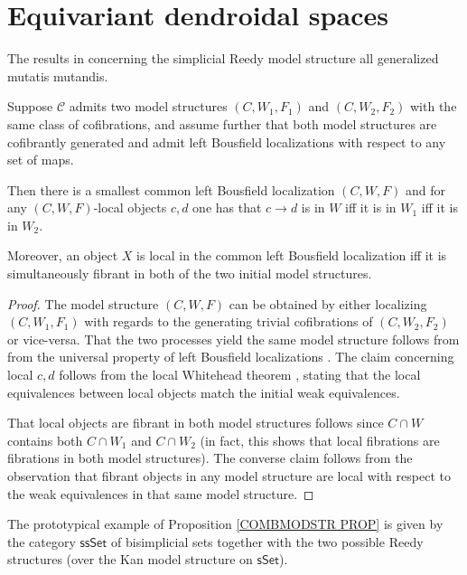 \documentclass[a4paper,10pt,draft]{article}%
\begin{document}
\section{Equivariant dendroidal spaces}

The results in \cite[\S 4]{CM13a}
concerning the simplicial Reedy model structure all generalized mutatis mutandis.

\begin{proposition}\label{COMBMODSTR PROP}
	Suppose $\mathcal{C}$
	admits two model structures $(C,W_1,F_1)$ and $(C,W_2,F_2)$
	with the same class of cofibrations, and assume further that both model structures are cofibrantly generated and admit left Bousfield localizations with respect to any set of maps.
	
	Then there is a smallest common left Bousfield localization 
	$(C,W,F)$ and for any $(C,W,F)$-local 
	objects $c,d$ one has that $c\to d$ is in $W$ iff it is in $W_1$ iff it is in $W_2$.
	
	Moreover, an object $X$ is local in the common left Bousfield localization iff it is simultaneously fibrant in both of the two initial model structures.
\end{proposition}

\begin{proof}
	The model structure $(C,W,F)$ can be obtained by either localizing $(C,W_1,F_1)$ with regards to the generating trivial cofibrations of $(C,W_2,F_2)$ or vice-versa. That the two processes yield the same model structure follows from from the universal property of left Bousfield localizations \cite[Prop. 3.4.18]{Hir03}.
	The claim concerning local $c,d$ follows from the local Whitehead theorem \cite[Thm. 3.3.8]{Hir03}, stating that
the local equivalences between local objects match the
initial weak equivalences.

That local objects are fibrant in both model structures follows since $C \cap W$ contains both $C \cap W_1$ and $C\cap W_2$ (in fact, this shows that local fibrations are fibrations in both model structures). The converse claim follows from the observation that fibrant objects in any model structure are local with respect to the weak equivalences in that same model structure.
\end{proof}

The prototypical example of Proposition \ref{COMBMODSTR PROP}
is given by the category $\mathsf{ssSet}$ of bisimplicial sets together with the two possible Reedy structures (over the Kan model structure on $\mathsf{sSet}$).
\end{document}
